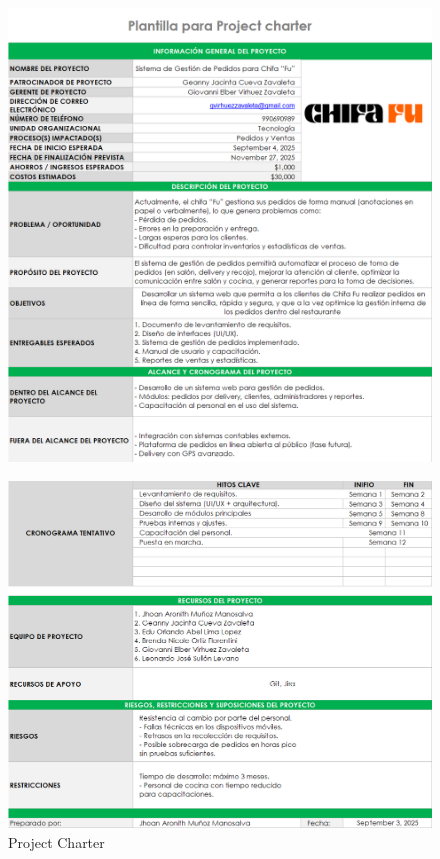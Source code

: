 \documentclass{article}
\begin{document}
\begin{doublespace}
\begin{figure}[H]
    \centering
    \includegraphics[width=\textwidth]{Gantt, WBS, Project Charter, BPM/projectCharter1.png}
    \label{fig:Project-Charter}
\end{figure}

\begin{figure}[H]
    \centering
    \includegraphics[width=\textwidth]{Gantt, WBS, Project Charter, BPM/projectCharter2.png}
    \caption{Project Charter}
    \label{fig:Project-Charter}
\end{figure}



\end{doublespace}
\end{document}
